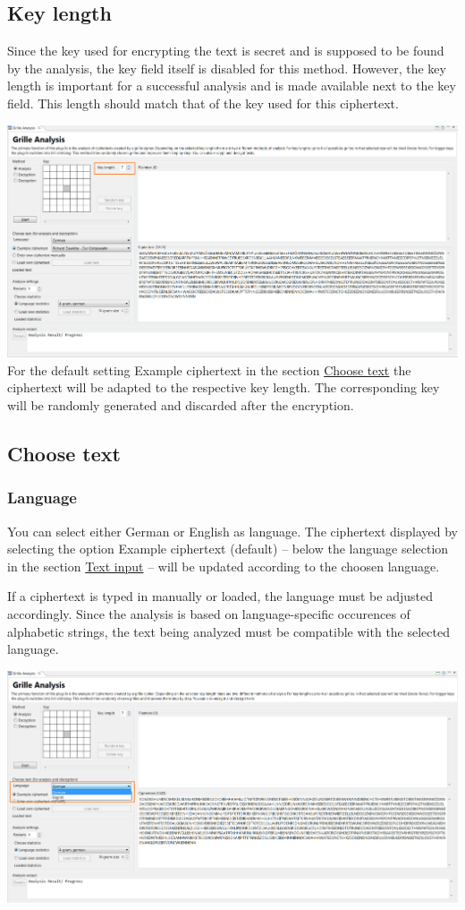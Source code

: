 \documentclass[fontsize=12pt, DIV=15, parskip=half-]{scrartcl}
\theoremstyle{break}
\begin{document}
\subsection{Key length}
Since the key used for encrypting the text is secret and is supposed to be found by the analysis, the key field itself is disabled for this method. 
However, the key length is important for a successful analysis and is made available next to the key field. This length should match that of the key used for this ciphertext.

\includegraphics[scale=0.45]{enFleissnerKeySize.png}
For the default setting \glqq Example ciphertext\grqq{} in the section \hyperlink{txtausw}{Choose text} the ciphertext will be adapted to the respective key length. The corresponding key will be randomly generated and discarded after the encryption.

\subsection{Choose text} \hypertarget{txtausw}{}
\subsubsection{Language}
You can select either \glqq German\grqq{} or \glqq English\grqq{} as language. The ciphertext displayed by selecting the option \glqq Example ciphertext\grqq{} (default) -- below the language selection in the section \hyperlink{txteing}{Text input} -- will be updated according to the choosen language.

If a ciphertext is typed in manually or loaded, the language must be adjusted accordingly. Since the analysis is based on language-specific occurences of alphabetic strings, the text being analyzed must be compatible with the selected language.


\includegraphics[scale=0.45]{enFleissnerLanguage.png}
\newpage
\end{document}
